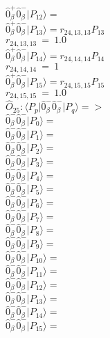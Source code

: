 \documentclass[14pt]{article}
\begin{document}
    $ \hat{0}_{\beta}^{+}\hat{0}_{\beta}^{-} \vert{P_{12}}\rangle =  $ \\ 
    $ \hat{0}_{\beta}^{+}\hat{0}_{\beta}^{-} \vert{P_{13}}\rangle = {r}_{24,13,13}P_{13} $ \\ 
    ${r}_{24,13,13}\ =\ 1.0 $ \\ 
    $ \hat{0}_{\beta}^{+}\hat{0}_{\beta}^{-} \vert{P_{14}}\rangle = {r}_{24,14,14}P_{14} $ \\ 
    ${r}_{24,14,14}\ =\ 1 $ \\ 
    $ \hat{0}_{\beta}^{+}\hat{0}_{\beta}^{-} \vert{P_{15}}\rangle = {r}_{24,15,15}P_{15} $ \\ 
    ${r}_{24,15,15}\ =\ 1.0 $ \\ 
    
    $\hat{O}_{25}:  \langle{P_p}\vert \hat{0}_{\beta}^{-}\hat{0}_{\beta}^{-} \vert{P_q}\rangle => $ \\ 
    $ \hat{0}_{\beta}^{-}\hat{0}_{\beta}^{-} \vert{P_{0}}\rangle =  $ \\ 
    $ \hat{0}_{\beta}^{-}\hat{0}_{\beta}^{-} \vert{P_{1}}\rangle =  $ \\ 
    $ \hat{0}_{\beta}^{-}\hat{0}_{\beta}^{-} \vert{P_{2}}\rangle =  $ \\ 
    $ \hat{0}_{\beta}^{-}\hat{0}_{\beta}^{-} \vert{P_{3}}\rangle =  $ \\ 
    $ \hat{0}_{\beta}^{-}\hat{0}_{\beta}^{-} \vert{P_{4}}\rangle =  $ \\ 
    $ \hat{0}_{\beta}^{-}\hat{0}_{\beta}^{-} \vert{P_{5}}\rangle =  $ \\ 
    $ \hat{0}_{\beta}^{-}\hat{0}_{\beta}^{-} \vert{P_{6}}\rangle =  $ \\ 
    $ \hat{0}_{\beta}^{-}\hat{0}_{\beta}^{-} \vert{P_{7}}\rangle =  $ \\ 
    $ \hat{0}_{\beta}^{-}\hat{0}_{\beta}^{-} \vert{P_{8}}\rangle =  $ \\ 
    $ \hat{0}_{\beta}^{-}\hat{0}_{\beta}^{-} \vert{P_{9}}\rangle =  $ \\ 
    $ \hat{0}_{\beta}^{-}\hat{0}_{\beta}^{-} \vert{P_{10}}\rangle =  $ \\ 
    $ \hat{0}_{\beta}^{-}\hat{0}_{\beta}^{-} \vert{P_{11}}\rangle =  $ \\ 
    $ \hat{0}_{\beta}^{-}\hat{0}_{\beta}^{-} \vert{P_{12}}\rangle =  $ \\ 
    $ \hat{0}_{\beta}^{-}\hat{0}_{\beta}^{-} \vert{P_{13}}\rangle =  $ \\ 
    $ \hat{0}_{\beta}^{-}\hat{0}_{\beta}^{-} \vert{P_{14}}\rangle =  $ \\ 
    $ \hat{0}_{\beta}^{-}\hat{0}_{\beta}^{-} \vert{P_{15}}\rangle =  $ \\ 
    
\end{document}

